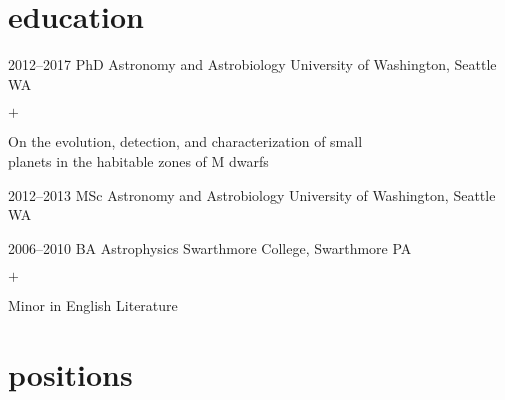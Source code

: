 \documentclass[]{luger-cv} %
\begin{document}
\section{education}

\begin{entrylist}


\entry
{2012--2017}
{PhD {\normalfont Astronomy and Astrobiology}}
{University of Washington, Seattle WA}
{%
\vspace{-1em}
\begin{list}{$+$}{\cvlist}
\item On the evolution, detection, and characterization of small \\ planets in the habitable zones of M dwarfs
\end{list}
}


\entry
{2012--2013}
{MSc {\normalfont Astronomy and Astrobiology}}
{University of Washington, Seattle WA}


\entry
{2006--2010}
{BA {\normalfont Astrophysics}}
{Swarthmore College, Swarthmore PA}
{\vspace{-1em}
\begin{list}{$+$}{\cvlist}
\item Minor in English Literature
\end{list}}


\end{entrylist}


\section{positions}
\end{document}
